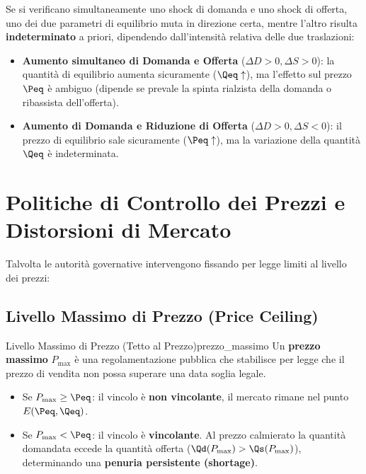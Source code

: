 \begin{osservazione}
Se si verificano simultaneamente uno shock di domanda e uno shock di offerta, uno dei due parametri di equilibrio muta in direzione certa, mentre l'altro risulta \textbf{indeterminato} a priori, dipendendo dall'intensità relativa delle due traslazioni:
\begin{itemize}
    \item \textbf{Aumento simultaneo di Domanda e Offerta} ($\Delta D > 0, \Delta S > 0$): la quantità di equilibrio aumenta sicuramente ($\Qeq \uparrow$), ma l'effetto sul prezzo $\Peq$ è ambiguo (dipende se prevale la spinta rialzista della domanda o ribassista dell'offerta).
    \item \textbf{Aumento di Domanda e Riduzione di Offerta} ($\Delta D > 0, \Delta S < 0$): il prezzo di equilibrio sale sicuramente ($\Peq \uparrow$), ma la variazione della quantità $\Qeq$ è indeterminata.
\end{itemize}
\end{osservazione}

\section{Politiche di Controllo dei Prezzi e Distorsioni di Mercato}

Talvolta le autorità governative intervengono fissando per legge limiti al livello dei prezzi:

\subsection{Livello Massimo di Prezzo (Price Ceiling)}

\begin{definizione}{Livello Massimo di Prezzo (Tetto al Prezzo)}{prezzo_massimo}
Un \textbf{prezzo massimo} $P_{\max}$ è una regolamentazione pubblica che stabilisce per legge che il prezzo di vendita non possa superare una data soglia legale.
\begin{itemize}
    \item Se $P_{\max} \ge \Peq$: il vincolo è \textbf{non vincolante}, il mercato rimane nel punto $E(\Peq, \Qeq)$.
    \item Se $P_{\max} < \Peq$: il vincolo è \textbf{vincolante}. Al prezzo calmierato la quantità domandata eccede la quantità offerta ($\Qd(P_{\max}) > \Qs(P_{\max})$), determinando una \textbf{penuria persistente (shortage)}.
\end{itemize}
\end{definizione}

